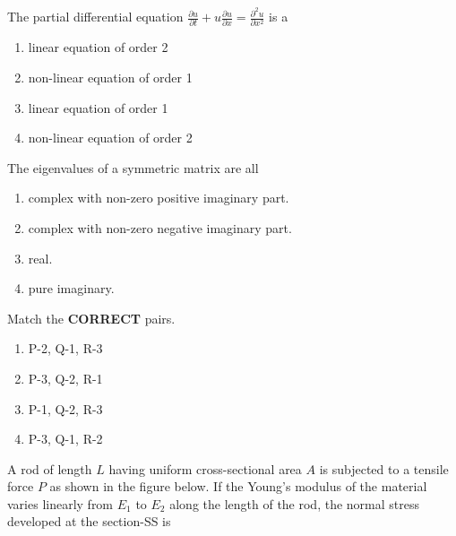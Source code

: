 \iffalse
\chapter{2013}
\author{AI24BTECH11009}
\section{me}
\fi

\item The partial differential equation $\frac{\partial u}{\partial t} + u\frac{\partial u}{\partial x} = \frac{\partial^2 u}{\partial x^2}$ is a
    \begin{enumerate}
      \item linear equation of order 2 
      \item non-linear equation of order 1
      \item linear equation of order 1
      \item non-linear equation of order 2  \\
    \end{enumerate}
\item The eigenvalues of a symmetric matrix are all  
\begin{enumerate}
    \item complex with non-zero positive imaginary part. 
    \item complex with non-zero negative imaginary part.
    \item real. 
    \item pure imaginary. \\
\end{enumerate}
\item Match the \textbf{CORRECT} pairs.
\begin{table}[h!]
  \centering
  
\end{table}
\begin{enumerate}
    \item P-2, Q-1, R-3 
    \item P-3, Q-2, R-1
    \item P-1, Q-2, R-3 
    \item P-3, Q-1, R-2  \\
\end{enumerate}
\item A rod of length $L$ having uniform cross-sectional area $A$ is subjected to a tensile force $P$ as shown in the figure below. If the Young's modulus of the material varies linearly from $E_1$ to $E_2$ along the length of the rod, the normal stress developed at the section-SS is 
